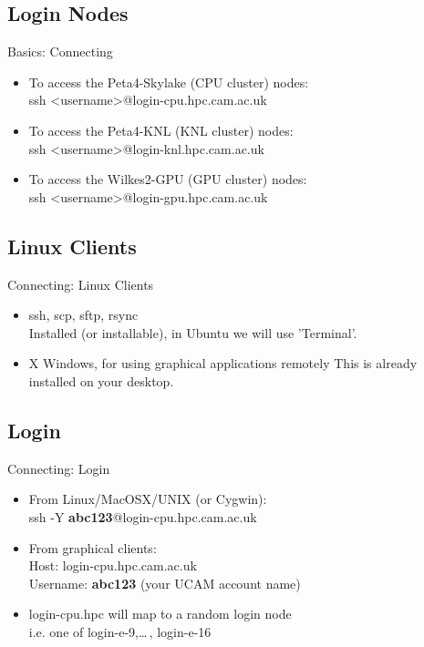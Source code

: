 \subsection{Login Nodes}
\begin{frame}{Basics: Connecting}
\begin{itemize}
\item To access the Peta4-Skylake (CPU cluster) nodes:\hfill\\
ssh \textless username\textgreater @login-cpu.hpc.cam.ac.uk
\item To access the Peta4-KNL (KNL cluster) nodes:\hfill\\
ssh \textless username\textgreater @login-knl.hpc.cam.ac.uk
\item To access the Wilkes2-GPU (GPU cluster) nodes:\hfill\\
ssh \textless username\textgreater @login-gpu.hpc.cam.ac.uk
\end{itemize}
\end{frame}

\subsection{Linux Clients}
\begin{frame}{Connecting: Linux Clients}
\begin{itemize}
\item {\color<2->{red}ssh}, scp, sftp, {rsync}\hfill\\
\alert{\small Installed (or installable), in Ubuntu we will use 'Terminal'.}
\item {X Windows, for using graphical applications remotely}
\alert{\small This is already installed on your desktop.}
\end{itemize}
\end{frame}

\subsection{Login}
\begin{frame}{Connecting: Login}
\begin{itemize}
\item From Linux/MacOSX/UNIX (or Cygwin):\hfill\\
\alert{ssh -Y \textbf{abc123}@login-cpu.hpc.cam.ac.uk}
\pause
\item From graphical clients:\hfill\\
Host: \alert{login-cpu.hpc.cam.ac.uk}\hfill\\
Username: \alert{\textbf{abc123}} (your UCAM account name)
\pause
\item login-cpu.hpc will map to a random login node\hfill\\
\alert{i.e. one of login-e-9,\ldots\,, login-e-16}\hfill\\
\end{itemize}
\end{frame}

